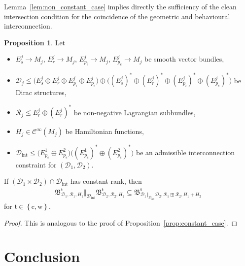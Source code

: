 \documentclass[preprint,12pt]{elsarticle}
\theoremstyle{definition}
\newtheorem{proposition}[theorem]{Proposition}
\newcommand{\set}[1]{\left\lbrace #1\right\rbrace}
\begin{document}
Lemma~\ref{lem:non_constant_case} implies directly the sufficiency of the clean intersection condition for the coincidence of the geometric and behavioural interconnection.

\begin{proposition}
Let
\begin{itemize}
\item $E_s^j\to M_j$, $E_r^j\to M_j$, $E_{p_i}^j\to M_j$, $E_{p_e}^j\to M_j$ be smooth vector bundles,
\item $\mathcal{D}_j\leq \big(E_s^j\oplus E_r^j\oplus E_{p_i}^j\oplus E_{p_e}^j\big)\oplus\big((E_s^j)^*\oplus (E_r^j)^*\oplus (E_{p_i}^j)^*\oplus (E_{p_e}^j)^*\big)$ be Dirac structures,
\item $\mathcal{R}_j\leq E_r^j\oplus (E_r^j)^*$ be non-negative Lagrangian subbundles,
\item $H_j\in\mathcal{C}^\infty(M_j)$ be Hamiltonian functions,
\item $\mathcal{D}_{\mathrm{int}}\leq \big(E_{p_e}^1\oplus E_{p_e}^2\big) \big((E_{p_e}^1)^*\oplus (E_{p_e}^2)^*\big)$ be an {admissible interconnection constraint} for $(\mathcal{D}_1,\mathcal{D}_2)$.
\end{itemize}
If $(\mathcal{D}_1\times\mathcal{D}_2)\cap\mathcal{D}_{\mathrm{int}}$ has constant rank, then
\begin{align*}
\mathfrak{B}^{\mathfrak{t}}_{\mathcal{D}_1,\mathcal{R}_1,H_1}\Vert_{\mathcal{D}_{\mathrm{int}}}\mathfrak{B}^{\mathfrak{t}}_{\mathcal{D}_2,\mathcal{R}_2,H_2}\subseteq\mathfrak{B}^{\mathfrak{t}}_{\mathcal{D}_1\Vert_{\mathcal{D}_{\mathrm{int}}}\mathcal{D}_2,\mathcal{R}_1\boxplus\mathcal{R}_2,H_1+H_2}
\end{align*}
for $\mathfrak{t}\in\set{\mathrm{c},\mathrm{w}}$.
\end{proposition}
\begin{proof}
This is analogous to the proof of Proposition~\ref{prop:constant_case}.
\end{proof}

\section{Conclusion}
\end{document}
